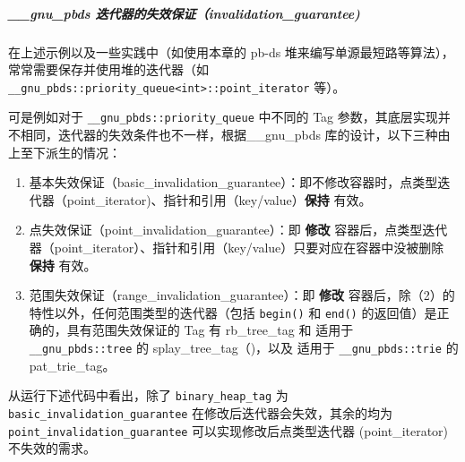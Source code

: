 \documentclass[]{article}
\let\oldsubparagraph\subparagraph
\renewcommand{\subparagraph}[1]{\oldsubparagraph{#1}\mbox{}}
\begin{document}
\hypertarget{gnu_pbds-ux8fedux4ee3ux5668ux7684ux5931ux6548ux4fddux8bc1invalidation_guarantee}{%
\subparagraph{\_\_gnu\_pbds
迭代器的失效保证（invalidation\_guarantee)}\label{gnu_pbds-ux8fedux4ee3ux5668ux7684ux5931ux6548ux4fddux8bc1invalidation_guarantee}}

在上述示例以及一些实践中（如使用本章的 pb-ds
堆来编写单源最短路等算法），常常需要保存并使用堆的迭代器（如
\texttt{\_\_gnu\_pbds::priority\_queue\textless{}int\textgreater{}::point\_iterator}
等）。

可是例如对于 \texttt{\_\_gnu\_pbds::priority\_queue} 中不同的 Tag
参数，其底层实现并不相同，迭代器的失效条件也不一样，根据\_\_gnu\_pbds
库的设计，以下三种由上至下派生的情况：

\begin{enumerate}
\def\labelenumi{\arabic{enumi}.}
\item
  基本失效保证（basic\_invalidation\_guarantee）：即不修改容器时，点类型迭代器（point\_iterator)、指针和引用（key/value）\textbf{保持}
  有效。
\item
  点失效保证（point\_invalidation\_guarantee）：即 \textbf{修改}
  容器后，点类型迭代器（point\_iterator）、指针和引用（key/value）只要对应在容器中没被删除
  \textbf{保持} 有效。
\item
  范围失效保证（range\_invalidation\_guarantee）：即 \textbf{修改}
  容器后，除（2）的特性以外，任何范围类型的迭代器（包括 \texttt{begin()}
  和 \texttt{end()} 的返回值）是正确的，具有范围失效保证的 Tag 有
  rb\_tree\_tag 和 适用于 \texttt{\_\_gnu\_pbds::tree} 的
  splay\_tree\_tag（)，以及 适用于 \texttt{\_\_gnu\_pbds::trie} 的
  pat\_trie\_tag。
\end{enumerate}

从运行下述代码中看出，除了 \texttt{binary\_heap\_tag} 为
\texttt{basic\_invalidation\_guarantee} 在修改后迭代器会失效，其余的均为
\texttt{point\_invalidation\_guarantee} 可以实现修改后点类型迭代器
(point\_iterator) 不失效的需求。
\end{document}
